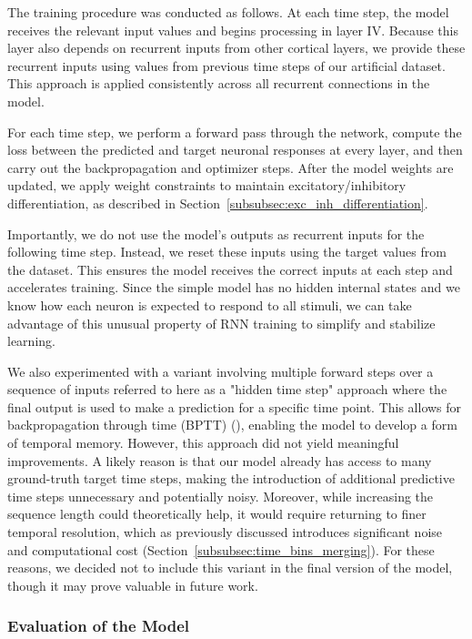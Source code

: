 The training procedure was conducted as follows. At each time step, the model receives the relevant input values and begins processing in layer IV. Because this layer also depends on recurrent inputs from other cortical layers, we provide these recurrent inputs using values from previous time steps of our artificial dataset. This approach is applied consistently across all recurrent connections in the model.

For each time step, we perform a forward pass through the network, compute the loss between the predicted and target neuronal responses at every layer, and then carry out the backpropagation and optimizer steps. After the model weights are updated, we apply weight constraints to maintain excitatory/inhibitory differentiation, as described in Section~\ref{subsubsec:exc_inh_differentiation}.

Importantly, we do not use the model's outputs as recurrent inputs for the following time step. Instead, we reset these inputs using the target values from the dataset. This ensures the model receives the correct inputs at each step and accelerates training. Since the simple model has no hidden internal states and we know how each neuron is expected to respond to all stimuli, we can take advantage of this unusual property of RNN training to simplify and stabilize learning.

We also experimented with a variant involving multiple forward steps over a sequence of inputs referred to here as a "hidden time step" approach where the final output is used to make a prediction for a specific time point. This allows for backpropagation through time (BPTT) (\citet{webos1990btt}), enabling the model to develop a form of temporal memory. However, this approach did not yield meaningful improvements. A likely reason is that our model already has access to many ground-truth target time steps, making the introduction of additional predictive time steps unnecessary and potentially noisy. Moreover, while increasing the sequence length could theoretically help, it would require returning to finer temporal resolution, which as previously discussed introduces significant noise and computational cost (Section~\ref{subsubsec:time_bins_merging}). For these reasons, we decided not to include this variant in the final version of the model, though it may prove valuable in future work.

\subsubsection{Evaluation of the Model}
\label{subsubsec:evaluation_model}

